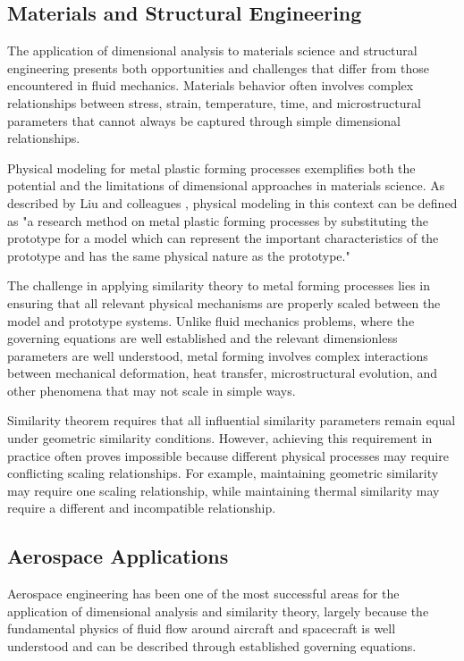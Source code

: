 \documentclass[
	11pt, %
	fleqn, %
	a4paper, %
]{LegrandOrangeBook}
\begin{document}
\subsection{Materials and Structural Engineering}

The application of dimensional analysis to materials science and structural engineering presents both opportunities and challenges that differ from those encountered in fluid mechanics. Materials behavior often involves complex relationships between stress, strain, temperature, time, and microstructural parameters that cannot always be captured through simple dimensional relationships.

Physical modeling for metal plastic forming processes exemplifies both the potential and the limitations of dimensional approaches in materials science. As described by Liu and colleagues \cite{liu2000}, physical modeling in this context can be defined as "a research method on metal plastic forming processes by substituting the prototype for a model which can represent the important characteristics of the prototype and has the same physical nature as the prototype."

The challenge in applying similarity theory to metal forming processes lies in ensuring that all relevant physical mechanisms are properly scaled between the model and prototype systems. Unlike fluid mechanics problems, where the governing equations are well established and the relevant dimensionless parameters are well understood, metal forming involves complex interactions between mechanical deformation, heat transfer, microstructural evolution, and other phenomena that may not scale in simple ways.

Similarity theorem requires that all influential similarity parameters remain equal under geometric similarity conditions. However, achieving this requirement in practice often proves impossible because different physical processes may require conflicting scaling relationships. For example, maintaining geometric similarity may require one scaling relationship, while maintaining thermal similarity may require a different and incompatible relationship.

\subsection{Aerospace Applications}

Aerospace engineering has been one of the most successful areas for the application of dimensional analysis and similarity theory, largely because the fundamental physics of fluid flow around aircraft and spacecraft is well understood and can be described through established governing equations.
\end{document}
